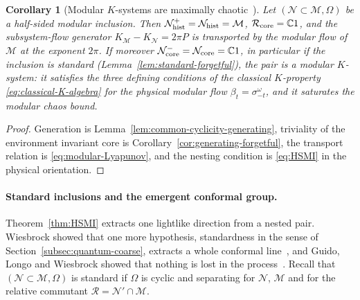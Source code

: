 \documentclass[a4paper,11pt]{article}
\newtheorem{corollary}[theorem]{Corollary}
\theoremstyle{definition}
\newcommand{\mR}{\mathcal{R}}
\newcommand{\mN}{\mathcal{N}}
\newcommand{\mM}{\mathcal{M}}
\begin{document}
\begin{corollary}[Modular $K$-systems are maximally chaotic~{\cite{OFLLM2024}}]\label{cor:maximal-chaos-K-system}
Let $(\mN\subset\mM,\Omega)$ be a half-sided modular inclusion. Then $\mN_{\rm hist}^{+}=\mN_{\rm hist}=\mM$, $\mR_{\rm core}=\mathbb C1$, and the subsystem-flow generator $K_{\mM}-K_{\mN}=2\pi P$ is transported by the modular flow of $\mM$ at the exponent $2\pi$. If moreover $\mN_{\rm core}^{-}=\mN_{\rm core}=\mathbb C1$, in particular if the inclusion is standard (Lemma~\ref{lem:standard-forgetful}), the pair is a modular $K$-system: it satisfies the three defining conditions of the classical $K$-property \eqref{eq:classical-K-algebra} for the physical modular flow $\beta_t=\sigma^\omega_{-t}$, and it saturates the modular chaos bound.
\end{corollary}
\begin{proof}
Generation is Lemma~\ref{lem:common-cyclicity-generating}, triviality of the environment invariant core is Corollary~\ref{cor:generating-forgetful}, the transport relation is \eqref{eq:modular-Lyapunov}, and the nesting condition is \eqref{eq:HSMI} in the physical orientation.
\end{proof}

\paragraph{Standard inclusions and the emergent conformal group.}
Theorem~\ref{thm:HSMI} extracts one lightlike direction from a nested pair. Wiesbrock showed that one more hypothesis, standardness in the sense of Section~\ref{subsec:quantum-coarse}, extracts a whole conformal line~\cite{Wiesbrock1993b}, and Guido, Longo and Wiesbrock showed that nothing is lost in the process~\cite{GuidoLongoWiesbrock1998}. Recall that $(\mN\subset\mM,\Omega)$ is standard if $\Omega$ is cyclic and separating for $\mN$, $\mM$ and for the relative commutant $\mR=\mN'\cap\mM$.
\end{document}

